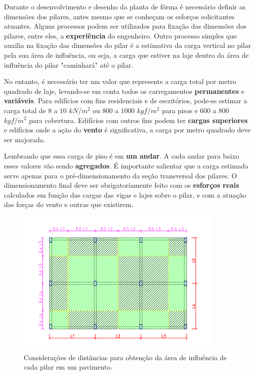 Durante o desenvolvimento e desenho da planta de fôrma é necessário definir as dimensões dos pilares, antes mesmo que se conheçam os esforços solicitantes atuantes. Alguns processos podem ser utilizados para fixação das dimensões dos pilares, entre eles, a \textbf{experiência} do engenheiro. Outro processo simples que auxilia na fixação das dimensões do pilar é a estimativa da carga vertical no pilar pela sua área de influência, ou seja, a carga que estiver na laje dentro da área de influência do pilar "caminhará" até o pilar.

No entanto, é necessário ter um valor que represente a carga total por metro quadrado de laje, levando-se em conta todos os carregamentos \textbf{permanentes} e \textbf{variáveis}. Para edifícios com fins residenciais e de escritórios, pode-se estimar a carga total de \textbf{$8$} a $10$ $kN/m^2$ ou $800$ a $1000$ $kgf/m^2$ para pisos e $600$ a $800$ $kgf/m^2$ para cobertura. Edifícios com outros fins podem ter \textbf{cargas superiores} e edifícios onde a ação do \textbf{vento} é significativa, a carga por metro quadrado deve ser majorada.

Lembrando que essa carga de piso é em \textbf{um andar}. A cada andar para baixo esses valores vão sendo \textbf{agregados}. É importante salientar que a carga estimada serve apenas para o pré-dimensionamento da seção transversal dos pilares. O dimensionamento final deve ser obrigatoriamente feito com os \textbf{esforços reais} calculados em função das cargas das vigas e lajes sobre o pilar, e com a atuação das forças do vento e outras que existirem.

\begin{figure}[H]
	\begin{center}
	\caption{Considerações de distâncias para obtenção da área de influência de cada pilar em um pavimento.}
    	\includegraphics[width=0.9\textwidth]{Carga-sobre-pilares/Imagens/Area-de-influencia.png}
	\end{center}
\end{figure}

